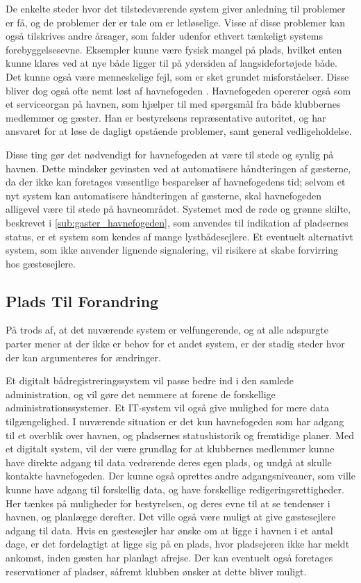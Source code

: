 De enkelte steder hvor det tilstedeværende system giver anledning til problemer er få, og de problemer der er tale om er letløselige. Visse af disse problemer kan også tilskrives andre årsager, som falder udenfor ethvert tænkeligt systems forebyggelsesevne. Eksempler kunne være fysisk mangel på plads, hvilket enten kunne klares ved at nye både ligger til på ydersiden af langsidefortøjede både. Det kunne også være menneskelige fejl, som er sket grundet misforståelser. Disse bliver dog også ofte nemt løst af havnefogeden \cite{int_hf}. Havnefogeden opererer også som et serviceorgan på havnen, som hjælper til med spørgsmål fra både klubbernes medlemmer og gæster. Han er bestyrelsens repræsentative autoritet, og har ansvaret for at løse de dagligt opstående problemer, samt general vedligeholdelse. 

Disse ting gør det nødvendigt for havnefogeden at være til stede og synlig på havnen. Dette mindsker gevinsten ved at automatisere håndteringen af gæsterne, da der ikke kan foretages væsentlige besparelser af havnefogedens tid; selvom et nyt system kan automatisere håndteringen af gæsterne, skal havnefogeden alligevel være til stede på havneområdet. Systemet med de røde og grønne skilte, beskrevet i \cref{sub:gaster_havnefogeden}, som anvendes til indikation af pladsernes status, er et system som kendes af mange lystbådesejlere. Et eventuelt alternativt system, som ikke anvender lignende signalering, vil risikere at skabe forvirring hos gæstesejlere.

\subsection{Plads Til Forandring}\label{sec:forandring}

På trods af, at det nuværende system er velfungerende, og at alle adspurgte parter mener at der ikke er behov for et andet system, er der stadig steder hvor der kan argumenteres for ændringer.

Et digitalt bådregistreringssystem vil passe bedre ind i den samlede administration, og vil gøre det nemmere at forene de forskellige administrationssystemer. Et IT-system vil også give mulighed for mere data tilgængelighed. I nuværende situation er det kun havnefogeden som har adgang til et overblik over havnen, og pladsernes statushistorik og fremtidige planer. Med et digitalt system, vil der være grundlag for at klubbernes medlemmer kunne have direkte adgang til data vedrørende deres egen plads, og undgå at skulle kontakte havnefogeden. Der kunne også oprettes andre adgangsniveauer, som ville kunne have adgang til forskellig data, og have forskellige redigeringsrettigheder. Her tænkes på muligheder for bestyrelsen, og deres evne til at se tendenser i havnen, og planlægge derefter. Det ville også være muligt at give gæstesejlere adgang til data. Hvis en gæstesejler har ønske om at ligge i havnen i et antal dage, er det fordelagtigt at ligge sig på en plads, hvor pladsejeren ikke har meldt ankomst, inden gæsten har planlagt afrejse. Der kan eventuelt også foretages reservationer af pladser, såfremt klubben ønsker at dette bliver muligt.

